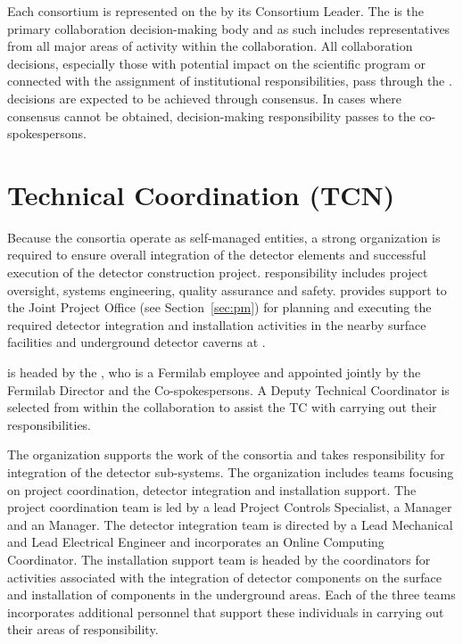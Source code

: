 Each consortium is represented on the   by
its Consortium Leader.  The   is the primary
collaboration decision-making body and as such includes
representatives from all major areas of activity within the
collaboration.  All collaboration decisions, especially those with
potential impact on the  scientific program or connected with the
assignment of institutional responsibilities, pass through the
.   decisions are expected to be
achieved through consensus.  In cases where consensus cannot be
obtained, decision-making responsibility passes to the
co-spokespersons.

\section{Technical Coordination (TCN)}
\label{sec:tc}

Because the consortia operate as self-managed entities, a strong
 organization is required to ensure 
overall integration of the detector elements and successful
execution of the detector construction project.  
responsibility includes project oversight,
systems engineering, quality assurance and safety.  
provides support to the Joint Project Office (see
Section~\ref{sec:pm}) for planning and executing the required detector
integration and installation activities in the nearby surface
facilities and underground detector caverns at \surf.

 is headed by the , who is a
Fermilab employee and appointed jointly by the Fermilab Director and
the  Co-spokespersons.  A Deputy Technical Coordinator is
selected from within the collaboration to assist the TC with carrying
out their responsibilities.

The  organization supports the work of the consortia and
takes responsibility for integration of the detector
sub-systems.  The organization includes teams focusing on project
coordination, detector integration and installation support.  The
project coordination team is led by a lead Project Controls
Specialist, a  Manager and an  Manager.  The
detector integration team is directed by a Lead Mechanical and Lead
Electrical Engineer and incorporates an Online Computing Coordinator.
The installation support team is headed by the coordinators for
activities associated with the integration of detector components on
the surface and installation of components in the underground areas.
Each of the three teams incorporates additional personnel that support
these individuals in carrying out their areas of responsibility.


